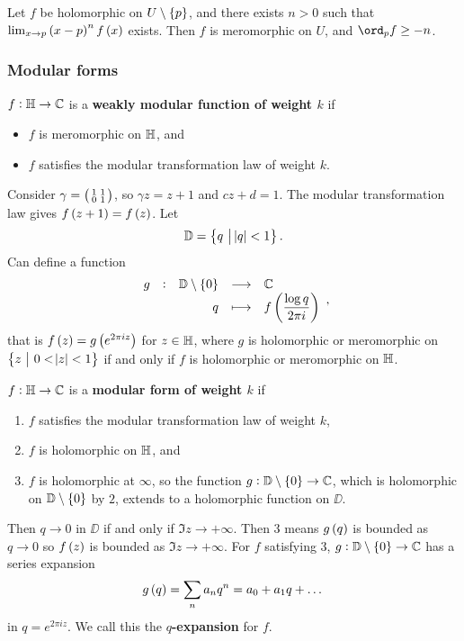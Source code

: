\begin{theorem}
Let $ f $ be holomorphic on $ U \setminus \cbr{p} $, and there exists $ n > 0 $ such that $ \lim_{x \to p} \br{x - p}^nf\br{x} $ exists. Then $ f $ is meromorphic on $ U $, and $ \ord_p f \ge -n $.
\end{theorem}

\subsubsection{Modular forms}

\begin{definition}
$ f : \mathbb{H} \to \mathbb{C} $ is a \textbf{weakly modular function of weight $ k $} if
\begin{itemize}
\item $ f $ is meromorphic on $ \mathbb{H} $, and
\item $ f $ satisfies the modular transformation law of weight $ k $.
\end{itemize}
\end{definition}

Consider $ \gamma = \begin{psmallmatrix} 1 & 1 \\ 0 & 1 \end{psmallmatrix} $, so $ \gamma z = z + 1 $ and $ cz + d = 1 $. The modular transformation law gives $ f\br{z + 1} = f\br{z} $. Let
$$ \DD = \cbr{q \st \abs{q} < 1}. $$
Can define a function
$$ \function[g]{\DD \setminus \cbr{0}}{\CC}{q}{f\br{\dfrac{\log q}{2\pi i}}}, $$
that is $ f\br{z} = g\br{e^{2\pi iz}} $ for $ z \in \mathbb{H} $, where $ g $ is holomorphic or meromorphic on $ \cbr{z \st 0 < \abs{z} < 1} $ if and only if $ f $ is holomorphic or meromorphic on $ \mathbb{H} $.

\begin{definition}
$ f : \mathbb{H} \to \mathbb{C} $ is a \textbf{modular form of weight $ k $} if
\begin{enumerate}
\item $ f $ satisfies the modular transformation law of weight $ k $,
\item $ f $ is holomorphic on $ \mathbb{H} $, and
\item $ f $ is holomorphic at $ \infty $, so the function $ g : \DD \setminus \cbr{0} \to \CC $, which is holomorphic on $ \DD \setminus \cbr{0} $ by $ 2 $, extends to a holomorphic function on $ \DD $.
\end{enumerate}
\end{definition}

\pagebreak

Then $ q \to 0 $ in $ \DD $ if and only if $ \Im z \to +\infty $. Then $ 3 $ means $ g\br{q} $ is bounded as $ q \to 0 $ so $ f\br{z} $ is bounded as $ \Im z \to +\infty $. For $ f $ satisfying $ 3 $, $ g : \DD \setminus \cbr{0} \to \CC $ has a series expansion
$$ g\br{q} = \sum_n a_nq^n = a_0 + a_1q + \dots $$
in $ q = e^{2\pi iz} $. We call this the \textbf{$ q $-expansion} for $ f $.

